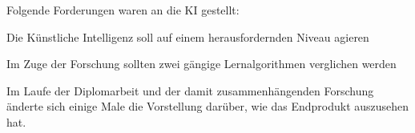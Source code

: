 Folgende Forderungen waren an die KI gestellt:
\begin{compactitem}
    \item Die Künstliche Intelligenz soll auf einem herausfordernden Niveau agieren
    \item Im Zuge der Forschung sollten zwei gängige Lernalgorithmen verglichen werden
\end{compactitem}


Im Laufe der Diplomarbeit und der damit zusammenhängenden Forschung änderte sich einige Male die
Vorstellung darüber, wie das Endprodukt auszusehen hat.


